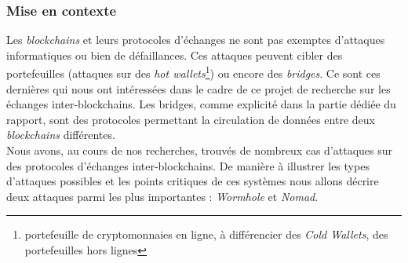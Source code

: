 \subsubsection{Mise en contexte}
Les \textit{\gls{blockchain}s} et leurs protocoles d'échanges ne sont pas exemptes d'attaques informatiques ou bien de défaillances.
Ces attaques peuvent cibler des portefeuilles (attaques sur des \textit{hot wallets}\footnote{portefeuille de cryptomonnaies en ligne, à différencier des \textit{Cold Wallets}, des portefeuilles hors lignes}) ou encore des \textit{bridges}. 
Ce sont ces dernières qui nous ont intéressées dans le cadre de ce projet de recherche sur les échanges inter-\gls{blockchain}s. 
Les bridges, comme explicité dans la partie dédiée du rapport, sont des protocoles permettant la circulation de données entre deux \textit{\gls{blockchain}s} différentes.\\
Nous avons, au cours de nos recherches, trouvés de nombreux cas d'attaques sur des protocoles d'échanges inter-\gls{blockchain}s. 
De manière à illustrer les types d'attaques possibles et les points critiques de ces systèmes nous allons décrire deux attaques parmi les plus importantes : \textit{Wormhole} et \textit{Nomad}.

